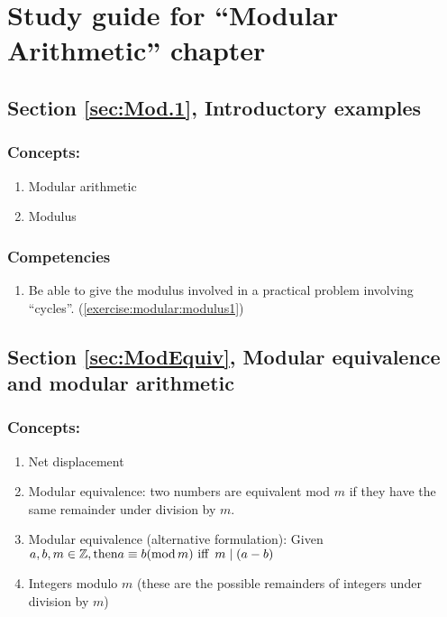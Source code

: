 \section{Study guide  for ``Modular Arithmetic''  chapter}
\label{sec:ModularArithmetic:StudyGuide} 


\subsection*{Section \ref{sec:Mod.1}, Introductory examples}
\subsubsection*{Concepts:}
\begin{enumerate}
\item 
Modular arithmetic
\item
Modulus
\end{enumerate}

\subsubsection*{Competencies}
\begin{enumerate}
\item
Be able to give the modulus involved in a practical problem involving ``cycles''. (\ref{exercise:modular:modulus1}) 
\end{enumerate}


\subsection*{Section \ref{sec:ModEquiv}, Modular equivalence and modular arithmetic}
\subsubsection*{Concepts:}
\begin{enumerate}
\item 
Net displacement
\item 
Modular equivalence: two numbers are equivalent mod $m$ if they have the same remainder under division by $m$.
\item 
Modular equivalence (alternative formulation): Given $a, b, m \in \mathbb{Z}, \text{then}\\ a \equiv b(\text{mod}\, m) \mbox{ iff }\, m\mid(a-b)$
\item
Integers modulo $m$  (these are the possible remainders of integers under division by $m$)
\end{enumerate}


